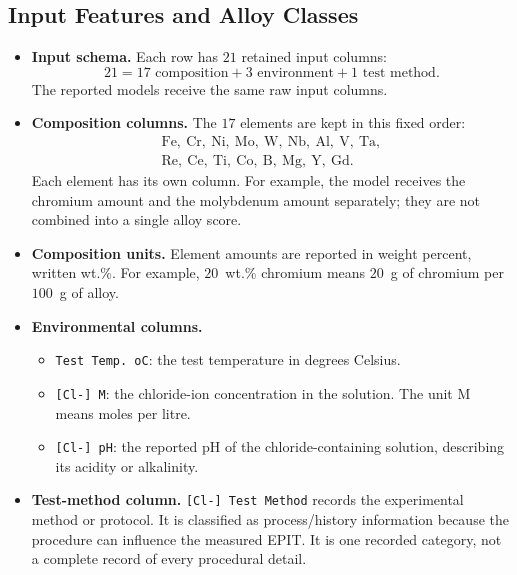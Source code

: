 \documentclass[11pt]{article}
\newenvironment{notes}
  {\begin{itemize}\setlength{\itemsep}{0.45em}\setlength{\parsep}{0pt}}
  {\end{itemize}}
\begin{document}
\subsection{Input Features and Alloy Classes}
\label{sec:dataset-features}

\begin{notes}
    \item \textbf{Input schema.} Each row has \(21\) retained input columns:
    \[
        21
        = 17\text{ composition}
        + 3\text{ environment}
        + 1\text{ test method}.
    \]
    The reported models receive the same raw input columns.

    \item \textbf{Composition columns.} The \(17\) elements are kept in
    this fixed order:
    \[
    \begin{gathered}
        \mathrm{Fe,\ Cr,\ Ni,\ Mo,\ W,\ Nb,\ Al,\ V,\ Ta,}\\
        \mathrm{Re,\ Ce,\ Ti,\ Co,\ B,\ Mg,\ Y,\ Gd}.
    \end{gathered}
    \]
    Each element has its own column. For example, the model receives the
    chromium amount and the molybdenum amount separately; they are not
    combined into a single alloy score.

    \item \textbf{Composition units.} Element amounts are reported in
    weight percent, written wt.\%. For example, \(20\)~wt.\% chromium
    means \(20\)~g of chromium per \(100\)~g of alloy.

    \item \textbf{Environmental columns.}
    \begin{notes}
        \item \texttt{Test Temp. oC}: the test temperature in degrees
        Celsius.
        \item \texttt{[Cl-] M}: the chloride-ion concentration in the
        solution. The unit M means moles per litre.
        \item \texttt{[Cl-] pH}: the reported pH of the chloride-containing
        solution, describing its acidity or alkalinity.
    \end{notes}

    \item \textbf{Test-method column.}
    \texttt{[Cl-] Test Method} records the experimental method or
    protocol. It is classified as process/history information because
    the procedure can influence the measured EPIT. It is one recorded
    category, not a complete record of every procedural detail.


\end{notes}
\end{document}
